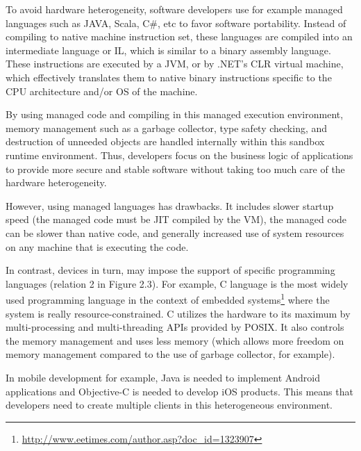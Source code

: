 To avoid hardware heterogeneity, software developers use for example managed languages such as JAVA, Scala, C\#, etc to favor software portability. Instead of compiling to native machine instruction set, these languages are compiled into an intermediate language or IL, which is similar to a binary assembly language. These instructions are executed by a JVM, or by .NET's CLR virtual machine, which effectively translates them to native binary instructions specific to the CPU architecture and/or OS of the machine.

By using managed code and compiling in this managed execution environment, memory management such as a garbage collector, type safety checking, and destruction of unneeded objects are handled internally within this sandbox runtime environment. Thus, developers focus on the business logic of applications to provide more secure and stable software without taking too much care of the hardware heterogeneity.

However, using managed languages has drawbacks. It includes slower startup speed (the managed code must be JIT compiled by the VM), the managed code can be slower than native code, and generally increased use of system resources on any machine that is executing the code.

In contrast, devices in turn, may impose the support of specific programming languages (relation 2 in Figure 2.3). 
For example, C language is the most widely used programming language in the context of embedded systems\footnote{\url{http://www.eetimes.com/author.asp?doc_id=1323907}} where the system is really resource-constrained. C utilizes the hardware to its maximum by multi-processing and multi-threading APIs provided by POSIX. It also controls the memory management and uses less memory (which allows more freedom on memory management compared to the use of garbage collector, for example).

In mobile development for example, Java is needed to implement Android applications and Objective-C is needed to develop iOS products. This means that developers need to create multiple clients in this heterogeneous environment. 


